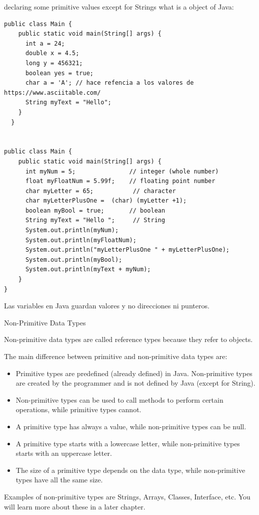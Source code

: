 declaring some primitive values except for Strings what is a object of Java:  

\begin{verbatim}
public class Main {
    public static void main(String[] args) {
      int a = 24;
      double x = 4.5;
      long y = 456321;
      boolean yes = true;
      char a = 'A'; // hace refencia a los valores de https://www.asciitable.com/
      String myText = "Hello";
    }
  }  
  
  
public class Main {
    public static void main(String[] args) {
      int myNum = 5;               // integer (whole number)
      float myFloatNum = 5.99f;    // floating point number
      char myLetter = 65;    		// character
      char myLetterPlusOne =  (char) (myLetter +1);
      boolean myBool = true;       // boolean
      String myText = "Hello ";     // String    
      System.out.println(myNum);
      System.out.println(myFloatNum);
      System.out.println("myLetterPlusOne " + myLetterPlusOne);
      System.out.println(myBool);
      System.out.println(myText + myNum);
    }
}   
\end{verbatim}
Las variables en Java guardan valores y no direcciones ni punteros.


Non-Primitive Data Types

Non-primitive data types are called reference types because they refer to objects.

The main difference between primitive and non-primitive data types are:
\begin{itemize}
    \item Primitive types are predefined (already defined) in Java. Non-primitive types are created by the programmer and is not defined by Java (except for String).
    \item Non-primitive types can be used to call methods to perform certain operations, while primitive types cannot.
    \item A primitive type has always a value, while non-primitive types can be null.
    \item A primitive type starts with a lowercase letter, while non-primitive types starts with an uppercase letter.
    \item The size of a primitive type depends on the data type, while non-primitive types have all the same size.
\end{itemize}
Examples of non-primitive types are Strings, Arrays, Classes, Interface, etc. You will learn more about these in a later chapter.

